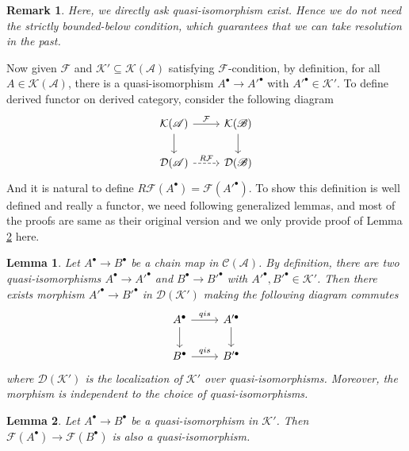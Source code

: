 \documentclass{ctexart}
\newtheorem{remark}{Remark}[section]
\newtheorem{lemma}{Lemma}[section]
\begin{document}
\begin{remark}
    Here, we directly ask quasi-isomorphism exist.
    Hence we do not need the strictly bounded-below condition, which guarantees that we can take resolution in the past.
\end{remark}
Now given $\mathcal{F}$ and $\mathcal{K}' \subseteq \mathcal{K}(\mathscr{A})$ satisfying $\mathcal{F}$-condition,
by definition, for all $A\in \mathcal{K}(\mathscr{A})$, there is a quasi-isomorphism $A^{\bullet} \rightarrow A'^{\bullet}$ with $A'^{\bullet}\in \mathcal{K}'$.
To define derived functor on derived category, consider the following diagram
\begin{equation}
    \begin{tikzcd}
        \mathcal{K}(\mathscr{A}) \arrow[r, "\mathcal{F}"] \arrow[d] &
        \mathcal{K}(\mathscr{B}) \arrow[d] \\
        \mathcal{D}(\mathscr{A}) \arrow[r, dashrightarrow, "R\mathcal{F}"] &
        \mathcal{D}(\mathscr{B})
    \end{tikzcd}
\end{equation}
And it is natural to define $R\mathcal{F}(A^{\bullet}) = \mathcal{F}(A'^{\bullet})$.
To show this definition is well defined and really a functor, we need following generalized lemmas,
and most of the proofs are same as their original version and we only provide proof of Lemma \ref{Lemma 6.13} here.
\begin{lemma}
    Let $A^{\bullet} \rightarrow B^{\bullet}$ be a chain map in $\mathcal{C}(\mathscr{A})$.
    By definition, there are two quasi-isomorphisms $A^{\bullet} \rightarrow A'^{\bullet}$ and $B^{\bullet} \rightarrow B'^{\bullet}$ with $A'^{\bullet},B'^{\bullet}\in \mathcal{K}'$.
    Then there exists morphism $A'^{\bullet} \rightarrow B'^{\bullet}$ in $\mathcal{D}(\mathcal{K}')$ making the following diagram commutes
    \begin{equation}
        \begin{tikzcd}
            A^{\bullet} \arrow[r, "qis"] \arrow[d] &
            A'^{\bullet} \arrow[d] \\
            B^{\bullet} \arrow[r, "qis"] &
            B'^{\bullet}
        \end{tikzcd}
    \end{equation}
    where $\mathcal{D}(\mathcal{K}')$ is the localization of $\mathcal{K}'$ over quasi-isomorphisms.
    Moreover, the morphism is independent to the choice of quasi-isomorphisms.
    \label{Lemma 6.12}
\end{lemma}
\begin{lemma}
    Let $A^{\bullet} \rightarrow B^{\bullet}$ be a quasi-isomorphism in $\mathcal{K}'$.
    Then $\mathcal{F}(A^{\bullet}) \rightarrow \mathcal{F}(B^{\bullet})$ is also a quasi-isomorphism.
    \label{Lemma 6.13}
\end{lemma}
\end{document}
